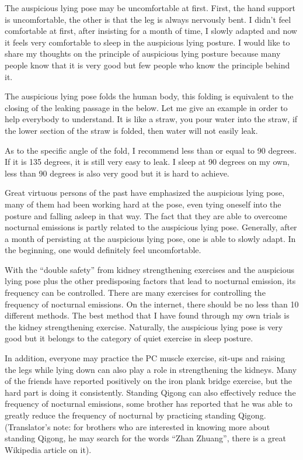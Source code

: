 \documentclass[
]{book}
\begin{document}
The auspicious lying pose may be uncomfortable at first. First, the hand support is uncomfortable, the other is that the leg is always nervously bent. I didn't feel comfortable at first, after insisting for a month of time, I slowly adapted and now it feels very comfortable to sleep in the auspicious lying posture. I would like to share my thoughts on the principle of auspicious lying posture because many people know that it is very good but few people who know the principle behind it.

The auspicious lying pose folds the human body, this folding is equivalent to the closing of the leaking passage in the below. Let me give an example in order to help everybody to understand. It is like a straw, you pour water into the straw, if the lower section of the straw is folded, then water will not easily leak.

As to the specific angle of the fold, I recommend less than or equal to 90 degrees. If it is 135 degrees, it is still very easy to leak. I sleep at 90 degrees on my own, less than 90 degrees is also very good but it is hard to achieve.

Great virtuous persons of the past have emphasized the auspicious lying pose, many of them had been working hard at the pose, even tying oneself into the posture and falling asleep in that way. The fact that they are able to overcome nocturnal emissions is partly related to the auspicious lying pose. Generally, after a month of persisting at the auspicious lying pose, one is able to slowly adapt. In the beginning, one would definitely feel uncomfortable.

With the ``double safety'' from kidney strengthening exercises and the auspicious lying pose plus the other predisposing factors that lead to nocturnal emission, its frequency can be controlled. There are many exercises for controlling the frequency of nocturnal emissions. On the internet, there should be no less than 10 different methods. The best method that I have found through my own trials is the kidney strengthening exercise. Naturally, the auspicious lying pose is very good but it belongs to the category of quiet exercise in sleep posture.

In addition, everyone may practice the PC muscle exercise, sit-ups and raising the legs while lying down can also play a role in strengthening the kidneys. Many of the friends have reported positively on the iron plank bridge exercise, but the hard part is doing it consistently. Standing Qigong can also effectively reduce the frequency of nocturnal emissions, some brother has reported that he was able to greatly reduce the frequency of nocturnal by practicing standing Qigong. (Translator's note: for brothers who are interested in knowing more about standing Qigong, he may search for the words ``Zhan Zhuang'', there is a great Wikipedia article on it).
\end{document}
